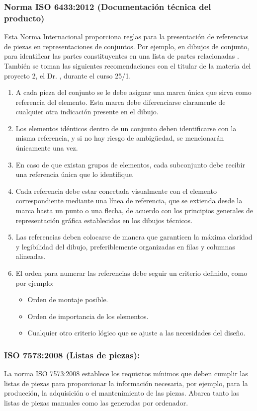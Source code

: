 \subsubsection{Norma ISO 6433:2012 (Documentación técnica del producto)}\rspitems
Esta Norma Internacional proporciona reglas para la presentación de referencias de piezas en representaciones de conjuntos. Por ejemplo, en dibujos de conjunto, para identificar las partes constituyentes en una lista de partes relacionadas \cite{iso_org-2024}.
También se toman las siguientes recomendaciones con el titular de la materia del proyecto 2, el Dr.  \citeauthor{sotomucino2024}, durante el curso 25/1.
\begin{enumerate}
	\item A cada pieza del conjunto se le debe asignar una marca única que sirva como referencia del elemento. Esta marca debe diferenciarse claramente de cualquier otra indicación presente en el dibujo.\rspitems	
	\item Los elementos idénticos dentro de un conjunto deben identificarse con la misma referencia, y si no hay riesgo de ambigüedad, se mencionarán únicamente una vez.	\rspitems
	\item En caso de que existan grupos de elementos, cada subconjunto debe recibir una referencia única que lo identifique.\rspitems
	\item Cada referencia debe estar conectada visualmente con el elemento correspondiente mediante una línea de referencia, que se extienda desde la marca hasta un punto o una flecha, de acuerdo con los principios generales de representación gráfica establecidos en los dibujos técnicos.\rspitems
	\item Las referencias deben colocarse de manera que garanticen la máxima claridad y legibilidad del dibujo, preferiblemente organizadas en filas y columnas alineadas.\rspitems
	\item El orden para numerar las referencias debe seguir un criterio definido, como por ejemplo:
	\begin{itemize}
		\item Orden de montaje posible.\rspitems
		\item Orden de importancia de los elementos.\rspitems
		\item Cualquier otro criterio lógico que se ajuste a las necesidades del diseño.\rspitems
	\end{itemize}
\end{enumerate}\rsp
\subsubsection{ISO 7573:2008 (Listas de piezas):}\rspitems
La norma ISO 7573:2008 establece los requisitos mínimos que deben cumplir las listas de piezas para proporcionar la información necesaria, por ejemplo, para la producción, la adquisición o el mantenimiento de las piezas. Abarca tanto las listas de piezas manuales como las generadas por ordenador.

